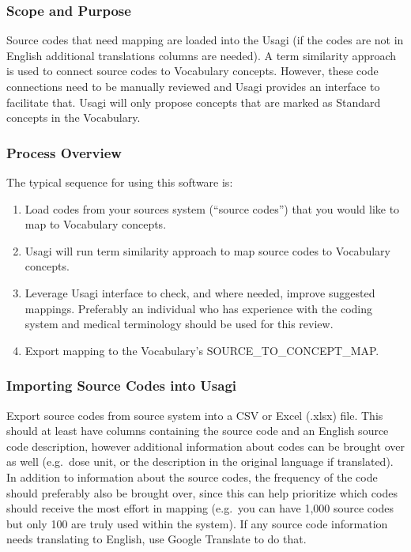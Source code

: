 \documentclass[11pt]{book}
\providecommand{\tightlist}{%
  \setlength{\itemsep}{0pt}\setlength{\parskip}{0pt}}
\theoremstyle{definition}
\theoremstyle{definition}
\theoremstyle{definition}
\theoremstyle{remark}
\begin{document}
\subsubsection*{Scope and Purpose}\label{scope-and-purpose-2}

Source codes that need mapping are loaded into the Usagi (if the codes
are not in English additional translations columns are needed). A term
similarity approach is used to connect source codes to Vocabulary
concepts. However, these code connections need to be manually reviewed
and Usagi provides an interface to facilitate that. Usagi will only
propose concepts that are marked as Standard concepts in the Vocabulary.

\subsubsection*{Process Overview}\label{process-overview-2}

The typical sequence for using this software is:

\begin{enumerate}
\def\labelenumi{\arabic{enumi}.}
\tightlist
\item
  Load codes from your sources system (``source codes'') that you would
  like to map to Vocabulary concepts.
\item
  Usagi will run term similarity approach to map source codes to
  Vocabulary concepts.
\item
  Leverage Usagi interface to check, and where needed, improve suggested
  mappings. Preferably an individual who has experience with the coding
  system and medical terminology should be used for this review.
\item
  Export mapping to the Vocabulary's SOURCE\_TO\_CONCEPT\_MAP.
\end{enumerate}

\subsubsection*{Importing Source Codes into
Usagi}\label{importing-source-codes-into-usagi}

Export source codes from source system into a CSV or Excel (.xlsx) file.
This should at least have columns containing the source code and an
English source code description, however additional information about
codes can be brought over as well (e.g.~dose unit, or the description in
the original language if translated). In addition to information about
the source codes, the frequency of the code should preferably also be
brought over, since this can help prioritize which codes should receive
the most effort in mapping (e.g.~you can have 1,000 source codes but
only 100 are truly used within the system). If any source code
information needs translating to English, use Google Translate to do
that.
\end{document}
